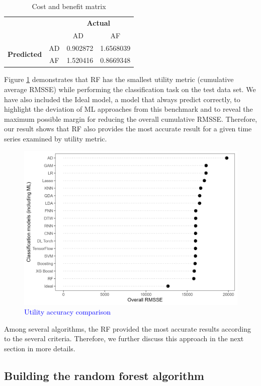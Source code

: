 \documentclass[preprint, 3p,
authoryear]{elsarticle} %
\begin{document}
\begin{table}
\caption{\label{tab:matrix}Cost and benefit matrix}
\centering
\begin{tabular}[t]{lccc}

\multicolumn{2}{c}{} & \multicolumn{2}{c}{\bf Actual}\\ 
\cline{3-4}
& & AD\  & AF\\
\hline
\multirow{2}{4em}{\bf Predicted} & AD & 0.902872 & 1.6568039\\
& AF & 1.520416 & 0.8669348\\
\hline
\end{tabular}
\end{table}

Figure \ref{fig:tableCB} demonstrates that RF has the smallest utility
metric (cumulative average RMSSE) while performing the classification
task on the test data set. We have also included the Ideal model, a
model that always predict correctly, to highlight the deviation of ML
approaches from this benchmark and to reveal the maximum possible margin
for reducing the overall cumulative RMSSE. Therefore, our result shows
that RF also provides the most accurate result for a given time series
examined by utility metric.

\begin{figure}[H]

{\centering \includegraphics[width=0.6\linewidth]{img/300dpi/utility} 

}

\caption{ \textcolor{blue}{Utility accuracy comparison} }\label{fig:tableCB}
\end{figure}

Among several algorithms, the RF provided the most accurate results
according to the several criteria. Therefore, we further discuss this
approach in the next section in more details.

\hypertarget{building-the-random-forest-algorithm}{%
\subsection{Building the random forest
algorithm}\label{building-the-random-forest-algorithm}}
\end{document}
